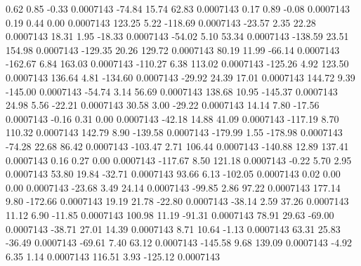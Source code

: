         0.62        0.85       -0.33     0.0007143
      -74.84       15.74       62.83     0.0007143
        0.17        0.89       -0.08     0.0007143
        0.19        0.44        0.00     0.0007143
      123.25        5.22     -118.69     0.0007143
      -23.57        2.35       22.28     0.0007143
       18.31        1.95      -18.33     0.0007143
      -54.02        5.10       53.34     0.0007143
     -138.59       23.51      154.98     0.0007143
     -129.35       20.26      129.72     0.0007143
       80.19       11.99      -66.14     0.0007143
     -162.67        6.84      163.03     0.0007143
     -110.27        6.38      113.02     0.0007143
     -125.26        4.92      123.50     0.0007143
      136.64        4.81     -134.60     0.0007143
      -29.92       24.39       17.01     0.0007143
      144.72        9.39     -145.00     0.0007143
      -54.74        3.14       56.69     0.0007143
      138.68       10.95     -145.37     0.0007143
       24.98        5.56      -22.21     0.0007143
       30.58        3.00      -29.22     0.0007143
       14.14        7.80      -17.56     0.0007143
       -0.16        0.31        0.00     0.0007143
      -42.18       14.88       41.09     0.0007143
     -117.19        8.70      110.32     0.0007143
      142.79        8.90     -139.58     0.0007143
     -179.99        1.55     -178.98     0.0007143
      -74.28       22.68       86.42     0.0007143
     -103.47        2.71      106.44     0.0007143
     -140.88       12.89      137.41     0.0007143
        0.16        0.27        0.00     0.0007143
     -117.67        8.50      121.18     0.0007143
       -0.22        5.70        2.95     0.0007143
       53.80       19.84      -32.71     0.0007143
       93.66        6.13     -102.05     0.0007143
        0.02        0.00        0.00     0.0007143
      -23.68        3.49       24.14     0.0007143
      -99.85        2.86       97.22     0.0007143
      177.14        9.80     -172.66     0.0007143
       19.19       21.78      -22.80     0.0007143
      -38.14        2.59       37.26     0.0007143
       11.12        6.90      -11.85     0.0007143
      100.98       11.19      -91.31     0.0007143
       78.91       29.63      -69.00     0.0007143
      -38.71       27.01       14.39     0.0007143
        8.71       10.64       -1.13     0.0007143
       63.31       25.83      -36.49     0.0007143
      -69.61        7.40       63.12     0.0007143
     -145.58        9.68      139.09     0.0007143
       -4.92        6.35        1.14     0.0007143
      116.51        3.93     -125.12     0.0007143
